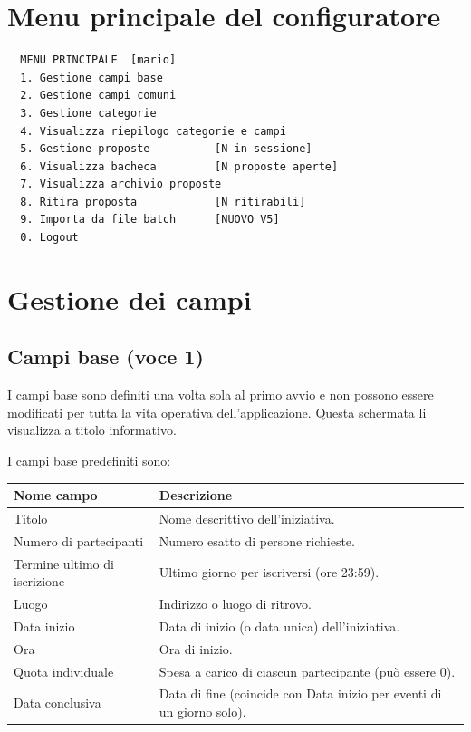 \documentclass[12pt,a4paper,oneside]{report}
\begin{document}
\section{Menu principale del configuratore}

\begin{lstlisting}
  MENU PRINCIPALE  [mario]
  1. Gestione campi base
  2. Gestione campi comuni
  3. Gestione categorie
  4. Visualizza riepilogo categorie e campi
  5. Gestione proposte          [N in sessione]
  6. Visualizza bacheca         [N proposte aperte]
  7. Visualizza archivio proposte
  8. Ritira proposta            [N ritirabili]
  9. Importa da file batch      [NUOVO V5]
  0. Logout
\end{lstlisting}

\section{Gestione dei campi}
\label{sec:campi}

\subsection{Campi base (voce 1)}
I campi base sono definiti una volta sola al primo avvio e non possono essere modificati per tutta la vita operativa dell'applicazione. Questa schermata li visualizza a titolo informativo.

I campi base predefiniti sono:

\begin{center}
\begin{tabular}{L{5cm}L{8cm}}
\toprule
\textbf{Nome campo} & \textbf{Descrizione} \\
\midrule
Titolo & Nome descrittivo dell'iniziativa. \\
Numero di partecipanti & Numero esatto di persone richieste. \\
Termine ultimo di iscrizione & Ultimo giorno per iscriversi (ore 23:59). \\
Luogo & Indirizzo o luogo di ritrovo. \\
Data inizio & Data di inizio (o data unica) dell'iniziativa. \\
Ora & Ora di inizio. \\
Quota individuale & Spesa a carico di ciascun partecipante (può essere 0). \\
Data conclusiva & Data di fine (coincide con Data inizio per eventi di un giorno solo). \\
\bottomrule
\end{tabular}
\end{center}
\end{document}
